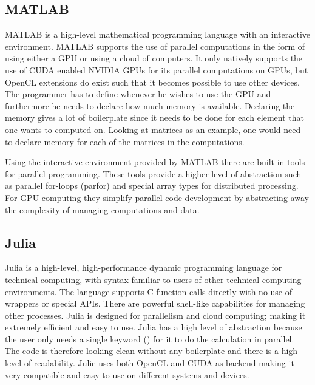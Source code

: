 \subsection{MATLAB}
MATLAB is a high-level mathematical programming language with an interactive environment.
MATLAB supports the use of parallel computations in the form of using either a GPU or using a cloud of computers.
It only natively supports the use of CUDA enabled NVIDIA GPUs for its parallel computations on GPUs, but OpenCL extensions do exist such that it becomes possible to use other devices.
The programmer has to define whenever he wishes to use the GPU and furthermore he needs to declare how much memory is available.
Declaring the memory gives a lot of boilerplate since it needs to be done for each element that one wants to computed on.
Looking at matrices as an example, one would need to declare memory for each of the matrices in the computations.\citep{MATLAB_backend,MATLAB_benchmark,}

Using the interactive environment provided by MATLAB there are built in tools for parallel programming.
These tools provide a higher level of abstraction such as parallel for-loops (parfor) and special array types for distributed processing.
For GPU computing they simplify parallel code development by abstracting away the complexity of managing computations and data.\citep{MATLAB_parallel}

\subsection{Julia}
Julia is a high-level, high-performance dynamic programming language for technical computing, with syntax familiar to users of other technical computing environments.
The language supports C function calls directly with no use of wrappers or special APIs.
There are powerful shell-like capabilities for managing other processes.
Julia is designed for parallelism and cloud computing; making it extremely efficient and easy to use.
Julia has a high level of abstraction because the user only needs a single keyword (\@parallel) for it to do the calculation in parallel.
The code is therefore looking clean without any boilerplate and there is a high level of readability.
Julie uses both OpenCL and CUDA as backend making it very compatible and easy to use on different systems and devices.\citep{Julia_Git,Julia}

